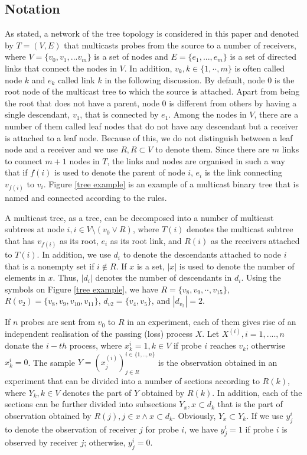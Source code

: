 \documentclass[10pt,onecolumn]{IEEEtran}
\begin{document}
\subsection{Notation}\label{treenotation}

As stated, a network of the tree topology is considered in this paper and denoted 
by $T=(V, E)$ that multicasts probes from the source to a number of receivers, where  $V=\{v_0, v_1, ... v_m\}$ is a set of
nodes and $E=\{e_1,..., e_m\}$ is a set of directed links that connect the
nodes in $V$. In addition, $v_k, k \in \{1,\cdot\cdot, m\}$ is often called node $k$ and $e_k$ called link $k$ in the following discussion. By default,  node $0$ is the root node of the multicast tree to which the source is attached. Apart from being the root that does not have a parent, node $0$ is different from  others by having a single descendant, $v_1$, that is connected by $e_1$.  Among the nodes in $V$, there are a number of them called leaf nodes that do not have any descendant but a receiver is attached to a leaf node. Because of this, we do not distinguish between a leaf node and a receiver and we use $R, R \subset V$ to denote them. Since there are $m$ links to connect  $m+1$ nodes in $T$, the links and nodes are organised in such a way that if $f(i)$ is used to denote
the parent of node $i$,  $e_i$ is the link connecting $v_{f(i)}$ to
$v_i$.  Figure \ref{tree example} is an example of a multicast binary tree that is named and connected according to the rules.

A multicast tree, as a tree, can be decomposed into a number of
 multicast subtrees at node $i, i \in V\setminus ( v_0 \lor R)$, where $T(i)$ denotes the multicast subtree that has $v_{f(i)}$ as its root, $e_i$ as its root link,  and $R(i)$ as the receivers attached to $T(i)$.  In addition, we use $d_i$  to denote the descendants attached to node $i$ that is a nonempty set if $i \notin R$. If $x$ is a set, $|x|$ is used to denote the number of elements in $x$. Thus, $|d_i|$ denotes the number of descendants in  $d_i$. Using the symbols on Figure \ref{tree example}, we have $R=\{v_8, v_9, \cdot\cdot, v_{15}\}$,  $R(v_2)=\{v_8, v_9, v_{10}, v_{11}\}$,  $d_{v2}=\{v_4, v_5\}$,  and $|d_{v_2}|=2$.

 If $n$ probes are sent from $v_0$ to $R$ in an experiment,
each of them gives rise of an independent realisation
of the passing (loss) process $X$. Let $X^{(i)}, i=1,...., n$ donate the $i-th$ process, where $x_k^i=1, k\in V$ if probe $i$
reaches $v_k$; otherwise $x_k^i=0$. The sample
$Y=(x_j^{(i)})^{i \in \{1,..,n\}}_{j \in R}$ is  the observation obtained in an experiment that can be divided into a number of sections according to $R(k)$, where $Y_k, k \in V$ denotes the part of $Y$ obtained by $R(k)$. In addition, each of the sections can be further divided into subsections $Y_x, x \subset d_k$ that is the part of observation obtained by $R(j), j \in x \land x \subset d_k$. Obviously, $Y_x \subset Y_k$.
If we use $y_j^i$ to denote the observation of receiver $j$ for probe $i$, we have $y_j^i=1$ if probe $i$ is observed by receiver $j$; otherwise, $y_j^i= 0$.
\end{document}

